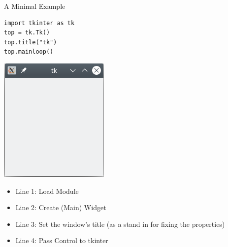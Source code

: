
\begin{frame}[fragile]{A Minimal Example}
%
\begin{tcbraster}[raster columns=2,
                  raster equal height,
                  nobeforeafter,
                  raster column skip=0.5cm]
\begin{codebox}
\begin{verbatim}
import tkinter as tk
top = tk.Tk()
top.title("tk")
top.mainloop()
\end{verbatim}
\end{codebox}
%
\begin{tcolorbox}[title=Output: Window with tkInter]
\centering
\includegraphics[width=.3\linewidth]{./gfx/12-tk-mini}
\end{tcolorbox}
\end{tcbraster}
%
\begin{itemize}
\item Line 1: Load Module
\item Line 2: Create (Main) Widget
\item Line 3: Set the window's title (as a stand in for fixing the properties)
\item Line 4: Pass Control to tkinter
\end{itemize}
%
\end{frame}


